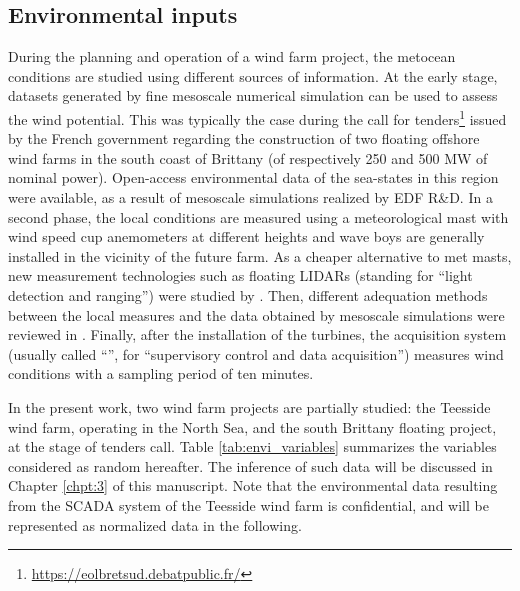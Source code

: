 \subsection{Environmental inputs}\label{sec:metocean_uncertainties}
During the planning and operation of a wind farm project, the metocean conditions are studied using different sources of information. 
At the early stage, datasets generated by fine mesoscale numerical simulation can be used to assess the wind potential. 
This was typically the case during the call for tenders\footnote{\url{https://eolbretsud.debatpublic.fr/}} issued by the French government regarding the construction of two floating offshore wind farms in the south coast of Brittany (of respectively 250 and 500 MW of nominal power). 
Open-access environmental data of the sea-states in this region were available, as a result of mesoscale simulations \citep{raoult_2018_anemoc3} realized by EDF R\&D.    
In a second phase, the local conditions are measured using a meteorological mast with wind speed cup anemometers at different heights and wave boys are generally installed in the vicinity of the future farm. 
As a cheaper alternative to met masts, new measurement technologies such as floating LIDARs (standing for ``light detection and ranging'') were studied by \citet{gottschall_2017_floating_LIDAR}. 
Then, different adequation methods between the local measures and the data obtained by mesoscale simulations were reviewed in \citet{sempreviva_2008_wind_assessment_review}.  
Finally, after the installation of the turbines, the acquisition system (usually called ``'', for ``supervisory control and data acquisition'') measures wind conditions with a sampling period of ten minutes. 

In the present work, two wind farm projects are partially studied\footnotemark: the Teesside wind farm, operating in the North Sea, and the south Brittany floating project, at the stage of tenders call. 
Table \ref{tab:envi_variables} summarizes the variables considered as random hereafter. 
The inference of such data will be discussed in Chapter \ref{chpt:3} of this manuscript. 
Note that the environmental data resulting from the SCADA system of the Teesside wind farm is confidential, and will be represented as normalized data in the following. 


